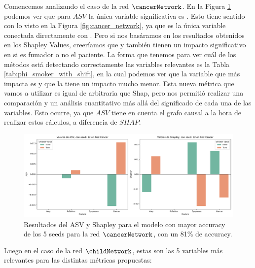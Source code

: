 Comencemos analizando el caso de la red $\cancerNetwork$. En la Figura \ref{fig:shapleyVsASVSingleSeedCancer} podemos ver que para $ASV$ la única variable significativa es . Esto tiene sentido con lo visto en la Figura \ref{fig:cancer_network}, ya que es la única variable conectada directamente con . Pero si nos basáramos en los resultados obtenidos en los Shapley Values, creeríamos que  y  también tienen un impacto significativo en si es fumador o no el paciente. La forma que tenemos para ver cuál de los métodos está detectando correctamente las variables relevantes es la Tabla \ref{tab:phi_smoker_with_shift}, en la cual podemos ver que la variable que más impacta es  y que la  tiene un impacto mucho menor. Esta nueva métrica que vamos a utilizar es igual de arbitraria que Shap, pero nos permitió realizar una comparación y un análisis cuantitativo más allá del significado de cada una de las variables.
Esto ocurre, ya que $ASV$ tiene en cuenta el grafo causal a la hora de realizar estos cálculos, a diferencia de $SHAP$. 

\begin{figure}
	\centering
	\includegraphics[width=1\linewidth]{img/asvResults/cancerASVAndShapleyExactASVAndShapley.png}
	\caption{Resultados del ASV y Shapley para el modelo con mayor accuracy de los 5 seeds para la red $\cancerNetwork$, con un 81\% de accuracy. }
	\label{fig:shapleyVsASVSingleSeedCancer}
\end{figure}

Luego en el caso de la red $\childNetwork$, estas son las 5 variables más relevantes para las distintas métricas propuestas:

